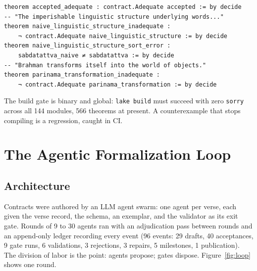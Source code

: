 \documentclass[11pt]{article}
\begin{document}
\begin{lstlisting}[language=lean, caption={Generated theorems for VP 1.1 (excerpt).}]
theorem accepted_adequate : contract.Adequate accepted := by decide
-- "The imperishable linguistic structure underlying words..."
theorem naive_linguistic_structure_inadequate :
    ¬ contract.Adequate naive_linguistic_structure := by decide
theorem naive_linguistic_structure_sort_error :
    sabdatattva_naive ≠ sabdatattva := by decide
-- "Brahman transforms itself into the world of objects."
theorem parinama_transformation_inadequate :
    ¬ contract.Adequate parinama_transformation := by decide
\end{lstlisting}

The build gate is binary and global: \texttt{lake build} must succeed with
zero \texttt{sorry} across all 144 modules, 566 theorems at present. A
counterexample that stops compiling is a regression, caught in CI.

\section{The Agentic Formalization Loop}
\label{sec:loop}

\subsection{Architecture}
Contracts were authored by an LLM agent swarm: one agent per verse, each
given the verse record, the schema, an exemplar, and the validator as its
exit gate. Rounds of 9 to 30 agents ran with an adjudication pass between
rounds and an append-only ledger recording every event (96 events: 29
drafts, 40 acceptances, 9 gate runs, 6 validations, 3 rejections, 3 repairs,
5 milestones, 1 publication). The division of labor is the point: agents
propose; gates dispose. Figure~\ref{fig:loop} shows one round.
\end{document}
